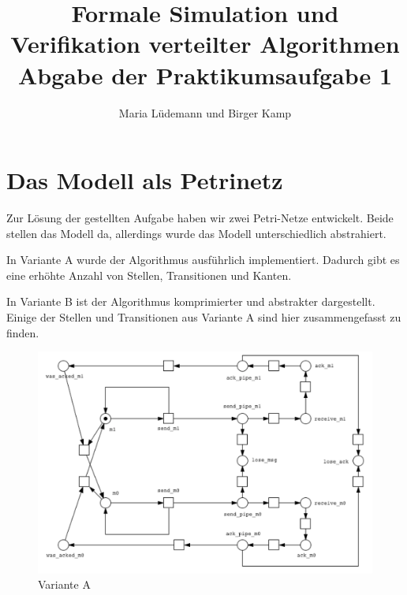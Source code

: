 \documentclass[]{scrartcl}
\title{Formale Simulation und Verifikation verteilter Algorithmen  \\ Abgabe der Praktikumsaufgabe 1}
\author{Maria Lüdemann und Birger Kamp}
\begin{document}
\maketitle

\begin{abstract}

\end{abstract}

\section{Das Modell als Petrinetz}
Zur Lösung der gestellten Aufgabe haben wir zwei Petri-Netze entwickelt. Beide stellen das Modell da, allerdings wurde das Modell unterschiedlich abstrahiert.

In Variante A wurde der Algorithmus ausführlich implementiert. Dadurch gibt es eine erhöhte Anzahl von Stellen, Transitionen und Kanten.

In Variante B ist der Algorithmus komprimierter und abstrakter dargestellt. Einige der Stellen und Transitionen aus Variante A sind hier zusammengefasst zu finden.
\begin{figure}[H]
	\centering
	\includegraphics[width=1\linewidth]{petrinet.png}
	\caption{Variante A}
	\label{fig:petri_net_A}
\end{figure}
\end{document}
